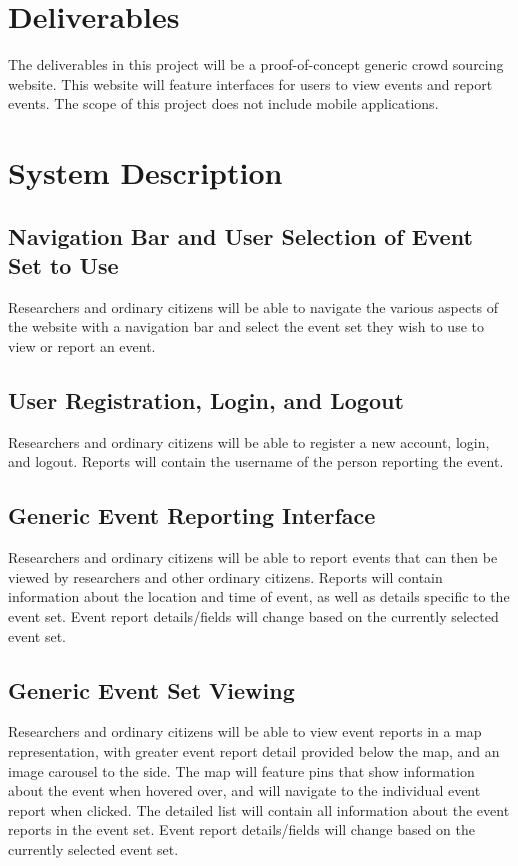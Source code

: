 \section{Deliverables}
The deliverables in this project will be a proof-of-concept generic crowd sourcing website. This website will feature interfaces for users to view events and report events. The scope of this project does not include mobile applications. 

\section{System Description}

\subsection{Navigation Bar and User Selection of Event Set to Use}
Researchers and ordinary citizens will be able to navigate the various aspects of the website with a navigation bar and select the event set they wish to use to view or report an event.

\subsection{User Registration, Login, and Logout}
Researchers and ordinary citizens will be able to register a new account, login, and logout. Reports will contain the username of the person reporting the event.

\subsection{Generic Event Reporting Interface}
Researchers and ordinary citizens will be able to report events that can then be viewed by researchers and other ordinary citizens. Reports will contain information about the location and time of event, as well as details specific to the event set. Event report details/fields will change based on the currently selected event set.

\subsection{Generic Event Set Viewing}
Researchers and ordinary citizens will be able to view event reports in a map representation, with greater event report detail provided below the map, and an image carousel to the side. The map will feature pins that show information about the event when hovered over, and will navigate to the individual event report when clicked. The detailed list will contain all information about the event reports in the event set. Event report details/fields will change based on the currently selected event set.

